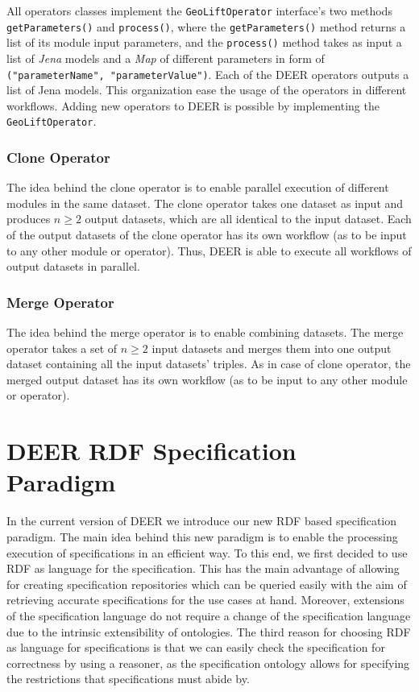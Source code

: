 \documentclass[a4paper,twoside,bibtotoc,abstracton,12pt,BCOR=15mm]{article}
\newcommand{\geolift}{\textsc{DEER}\xspace}
\begin{document}
  All operators classes implement the \texttt{GeoLiftOperator} interface's two methods \texttt{getParameters()} and \texttt{process()},
 where the \texttt{getParameters()} method returns a list of its module input parameters,
 and the \texttt{process()} method takes as input a list of \emph{Jena} models and a \emph{Map} of different parameters in form of \texttt{("parameterName", "parameterValue")}.
 Each of the \geolift operators outputs a list of Jena models.
 This organization ease the usage of the operators in different workflows.
 Adding new operators to \geolift is possible by implementing the \texttt{GeoLiftOperator}.

\subsubsection{Clone Operator}
The idea behind the clone operator is to enable parallel execution of different modules in the same dataset. 
The clone operator takes one dataset as input and produces $n \geq 2$ output datasets, which are all identical to the input dataset.
Each of the output datasets of the clone operator has its own workflow (as to be input to any other module or operator).
Thus, \geolift is able to execute all workflows of output datasets in parallel. 

\subsubsection{Merge Operator}
The idea behind the merge operator is to enable combining datasets.
The merge operator takes a set of $n \geq 2$ input datasets and merges them into one output dataset containing all the input datasets' triples.
As in case of clone operator, the merged output dataset has its own workflow (as to be input to any other module or operator).

\section{\geolift RDF Specification Paradigm}
In the current version of \geolift we introduce our new RDF based specification paradigm.
The main idea behind this new paradigm is to enable the processing execution of specifications in an efficient way.
To this end, we first decided to use RDF as language for the specification. This has the main advantage of allowing for creating specification repositories which can be queried easily with the aim of retrieving accurate specifications for the use cases at hand. Moreover, extensions of the specification language do not require a change of the specification language due to the intrinsic extensibility of ontologies. The third reason for choosing RDF as language for specifications is that we can easily check the specification for correctness by using a reasoner, as the specification ontology allows for specifying the restrictions that specifications must abide by.
\end{document}
